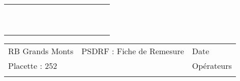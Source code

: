 \documentclass[a4paper, landscape]{article}\usepackage[]{graphicx}\usepackage[]{color}
\begin{document}
{\begin{tabular}{|p{1cm}|p{2cm}|p{1.6cm}|p{1.6cm}|p{1.6cm}|p{1.6cm}|p{1.5cm}|p{1.5cm}|p{1.5cm}|p{1.5cm}|p{1.5cm}|p{7.5cm}|p{5cm}|}
   \rowcolor[gray]{0.95} \hline
 &  &  &  &  &  &  &  &  &  &  &  &  \\ 
   \hline
 &  &  &  &  &  &  &  &  &  &  &  &  \\ 
   \rowcolor[gray]{0.95} \hline
 &  &  &  &  &  &  &  &  &  &  &  &  \\ 
   \hline
 &  &  &  &  &  &  &  &  &  &  &  &  \\ 
   \rowcolor[gray]{0.95} \hline
 &  &  &  &  &  &  &  &  &  &  &  &  \\ 
   \hline
 &  &  &  &  &  &  &  &  &  &  &  &  \\ 
   \rowcolor[gray]{0.95} \hline
 &  &  &  &  &  &  &  &  &  &  &  &  \\ 
   \hline
 &  &  &  &  &  &  &  &  &  &  &  &  \\ 
   \rowcolor[gray]{0.95} \hline
 &  &  &  &  &  &  &  &  &  &  &  &  \\ 
   \hline
 &  &  &  &  &  &  &  &  &  &  &  &  \\ 
   \rowcolor[gray]{0.95} \hline
 &  &  &  &  &  &  &  &  &  &  &  &  \\ 
   \hline
\end{tabular}
}

\begin{tabular}{p{10cm}p{10cm}p{8cm}}
  RB Grands Monts & PSDRF : Fiche de Remesure & Date \\ 
  Placette : 252 &  & Opérateurs \\ 
   &  &  \\ 
  \end{tabular}
\end{document}
